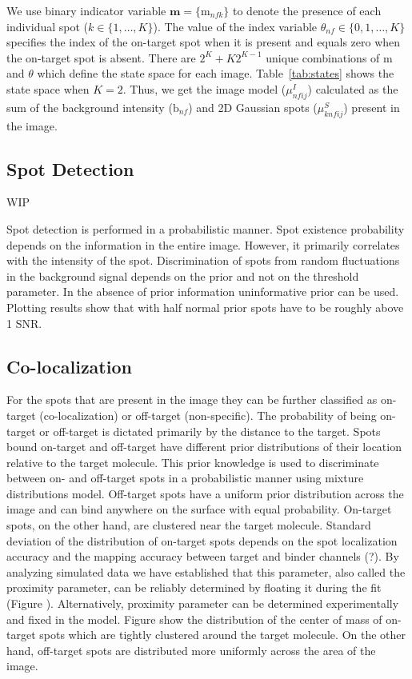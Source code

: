 We use binary indicator variable $\mathbf{m} = \{\mathrm{m}_{nfk}\}$ to denote the presence of each individual spot ($k \in \{1,\dots,K\}$). The value of the index variable $\theta_{nf} \in \{0,1,\dots,K\}$ specifies the index of the on-target spot when it is present and equals zero when the on-target spot is absent. There are $2^K + K2^{K-1}$ unique combinations of $\mathrm{m}$ and $\theta$ which define the state space for each image. Table~\ref{tab:states} shows the state space when $K=2$. Thus, we get the image model ($\mu^I_{nfij}$) calculated as the sum of the background intensity ($\mathrm{b}_{nf}$) and 2D Gaussian spots ($\mu^S_{knfij}$) present in the image.

\subsection{Spot Detection}

WIP

Spot detection is performed in a probabilistic manner. Spot existence probability depends on the information in the entire image. However, it primarily correlates with the intensity of the spot. Discrimination of spots from random fluctuations in the background signal depends on the prior and not on the threshold parameter. In the absence of prior information uninformative prior can be used. Plotting results show that with half normal prior spots have to be roughly above 1 SNR.

\subsection{Co-localization}

For the spots that are present in the image they can be further classified as on-target (co-localization) or off-target (non-specific). The probability of being on-target or off-target is dictated primarily by the distance to the target. Spots bound on-target and off-target have different prior distributions of their location relative to the target molecule. This prior knowledge is used to discriminate between on- and off-target spots in a probabilistic manner using mixture distributions model. Off-target spots have a uniform prior distribution across the image and can bind anywhere on the surface with equal probability. On-target spots, on the other hand, are clustered near the target molecule. Standard deviation of the distribution of on-target spots depends on the spot localization accuracy and the mapping accuracy between target and binder channels (?). By analyzing simulated data we have established that this parameter, also called the proximity parameter, can be reliably determined by floating it during the fit (Figure ). Alternatively, proximity parameter can be determined experimentally and fixed in the model. Figure show the distribution of the center of mass of on-target spots which are tightly clustered around the target molecule. On the other hand, off-target spots are distributed more uniformly across the area of the image.

